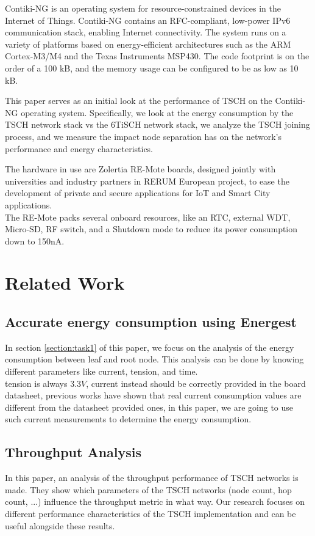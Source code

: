 \documentclass[conference]{IEEEtran}
\begin{document}
Contiki-NG is an operating system for resource-constrained devices in the Internet of Things. Contiki-NG contains an RFC-compliant, low-power IPv6 communication stack, enabling Internet connectivity. The system runs on a variety of platforms based on energy-efficient architectures such as the ARM Cortex-M3/M4 and the Texas Instruments MSP430. The code footprint is on the order of a 100 kB, and the memory usage can be configured to be as low as 10 kB. 

This paper serves as an initial look at the performance of TSCH on the Contiki-NG operating system. Specifically, we look at the energy consumption by the TSCH network stack vs the 6TiSCH network stack, we analyze the TSCH joining process, and we measure the impact node separation has on the network's performance and energy characteristics.

The hardware in use are Zolertia RE-Mote boards, designed jointly with universities and industry partners in RERUM European project, to ease the development of private and secure applications for IoT and Smart City applications.\\
The RE-Mote packs several onboard resources, like an RTC, external WDT, Micro-SD, RF switch, and a Shutdown mode to reduce its power consumption down to 150nA\cite{contiki-NGWiki}.

\section{Related Work}
\subsection{Accurate energy consumption using Energest}
In section \ref{section:task1} of this paper, we focus on the analysis of the energy consumption between leaf and root node. This analysis can be done by knowing different parameters like current, tension, and time.\\
tension is always $3.3V$, current instead should be correctly provided in the board datasheet, previous works have shown that real current consumption values are different from the datasheet provided ones\cite{EnergyConsumption}, in this paper, we are going to use such current measurements to determine the energy consumption.
\subsection{Throughput Analysis} In this paper, an analysis of the throughput performance of TSCH networks is made. They show which parameters of the TSCH networks (node count, hop count, ...) influence the throughput metric in what way. Our research focuses on different performance characteristics of the TSCH implementation and can be useful alongside these results\cite{ThroughputEvaluation}. 
\end{document}
